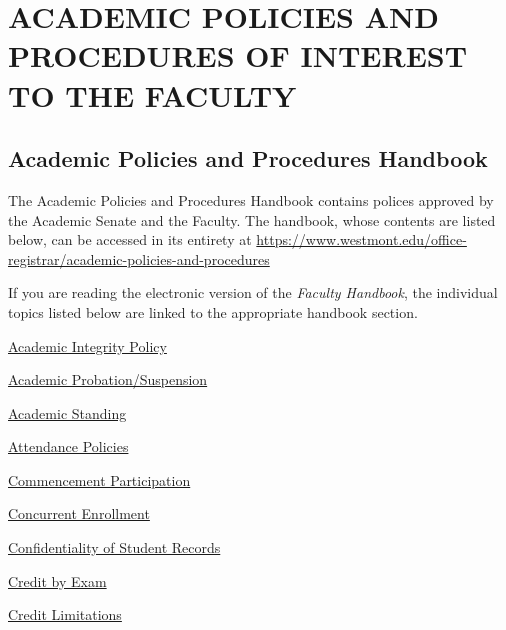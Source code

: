 
\section{ACADEMIC POLICIES AND PROCEDURES OF INTEREST TO THE FACULTY}
	\subsection{Academic Policies and Procedures Handbook}

		The Academic Policies and Procedures Handbook contains polices approved by
		the Academic Senate and the Faculty.  The handbook, whose contents are listed
		below, can be accessed in its entirety at
		\href{
			https://www.westmont.edu/office-registrar/academic-policies-and-procedures
		}{
			\url{https://www.westmont.edu/office-registrar/academic-policies-and-procedures}
		}

		If you are reading the electronic version of the \emph{Faculty Handbook}, the individual topics listed below are linked to the appropriate handbook section.

		\href{https://www.westmont.edu/office-provost/academic-program/academic-integrity-policy} {Academic Integrity Policy}

		\href{https://www.westmont.edu/office-registrar/academic-policies-and-procedures/academic-probationsuspension} {Academic Probation/Suspension}

		\href{https://www.westmont.edu/office-registrar/academic-policies-and-procedures/academic-standing} {Academic Standing}

		\href{https://www.westmont.edu/office-registrar/academic-policies-and-procedures/attendance-policies} {Attendance Policies}

		\href{https://www.westmont.edu/office-registrar/academic-policies-and-procedures/commencement-participation} {Commencement Participation}

		\href{https://www.westmont.edu/office-registrar/academic-policies-and-procedures/concurrent-enrollment} {Concurrent Enrollment}

		\href{https://www.westmont.edu/office-registrar/academic-policies-and-procedures/confidentiality-student-records} {Confidentiality of Student Records}

		\href{https://www.westmont.edu/office-registrar/academic-policies-and-procedures/credit-examination} {Credit by Exam}

		\href{https://www.westmont.edu/office-registrar/academic-policies-and-procedures/credit-limitations} {Credit Limitations}

